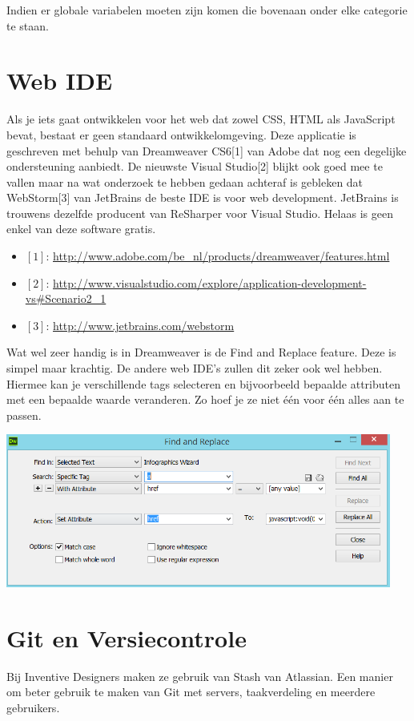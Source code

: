 Indien er globale variabelen moeten zijn komen die bovenaan onder elke categorie te staan.

\section{Web IDE}
Als je iets gaat ontwikkelen voor het web dat zowel CSS, HTML als JavaScript bevat, bestaat er geen standaard ontwikkelomgeving. Deze applicatie is geschreven met behulp van Dreamweaver CS6[1] van Adobe dat nog een degelijke ondersteuning aanbiedt. De nieuwste Visual Studio[2] blijkt ook goed mee te vallen maar na wat onderzoek te hebben gedaan achteraf is gebleken dat WebStorm[3] van JetBrains de beste IDE is voor web development. JetBrains is trouwens dezelfde producent van ReSharper voor Visual Studio. Helaas is geen enkel van deze software gratis.

\begin{itemize}
 \item $[1]$: \url{http://www.adobe.com/be_nl/products/dreamweaver/features.html}
 \item $[2]$: \url{http://www.visualstudio.com/explore/application-development-vs#Scenario2_1}
 \item $[3]$: \url{http://www.jetbrains.com/webstorm}
\end{itemize}

Wat wel zeer handig is in Dreamweaver is de Find and Replace feature. Deze is simpel maar krachtig. De andere web IDE's zullen dit zeker ook wel hebben. Hiermee kan je verschillende tags selecteren en bijvoorbeeld bepaalde attributen met een bepaalde waarde veranderen. Zo hoef je ze niet \'e\'en voor \'e\'en alles aan te passen.

\begin{center}
  \includegraphics[width=0.95\textwidth]{figures/chap2/dreamweaver.png}
\end{center}

\section{Git en Versiecontrole}
Bij Inventive Designers maken ze gebruik van Stash van Atlassian. Een manier om beter gebruik te maken van Git met servers, taakverdeling en meerdere gebruikers.

